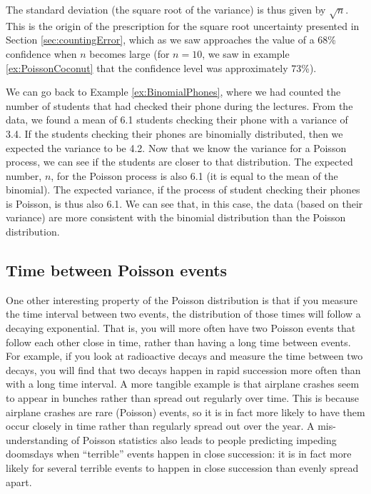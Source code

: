 The standard deviation (the square root of the variance) is thus given by $\sqrt{n}$. This is the origin of the prescription for the square root uncertainty presented in Section \ref{sec:countingError}, which as we saw approaches the value of a 68\% confidence when $n$ becomes large (for $n=10$, we saw in example \ref{ex:PoissonCoconut} that the confidence level was approximately 73\%).

We can go back to Example \ref{ex:BinomialPhones}, where we had counted the number of students that had checked their phone during the lectures. From the data, we found a mean of 6.1 students checking their phone with a variance of 3.4. If the students checking their phones are binomially distributed, then we expected the variance to be 4.2. Now that we know the variance for a Poisson process, we can see if the students are closer to that distribution. The expected number, $n$, for the Poisson process is also 6.1 (it is equal to the mean of the binomial). The expected variance, if the process of student checking their phones is Poisson, is thus also 6.1. We can see that, in this case, the data (based on their variance) are more consistent with the binomial distribution than the Poisson distribution.

\subsection{Time between Poisson events}
One other interesting property of the Poisson distribution is that if you measure the time interval between two events, the distribution of those times will follow a decaying exponential. That is, you will more often have two Poisson events that follow each other close in time, rather than having a long time between events. For example, if you look at radioactive decays and measure the time between two decays, you will find that two decays happen in rapid succession more often than with a long time interval. A more tangible example is that airplane crashes seem to appear in bunches rather than spread out regularly over time. This is because airplane crashes are rare (Poisson) events, so it is in fact more likely to have them occur closely in time rather than regularly spread out over the year. A mis-understanding of Poisson statistics also leads to people predicting impeding doomsdays when ``terrible'' events happen in close succession: it is in fact more likely for several terrible events to happen in close succession than evenly spread apart. 

